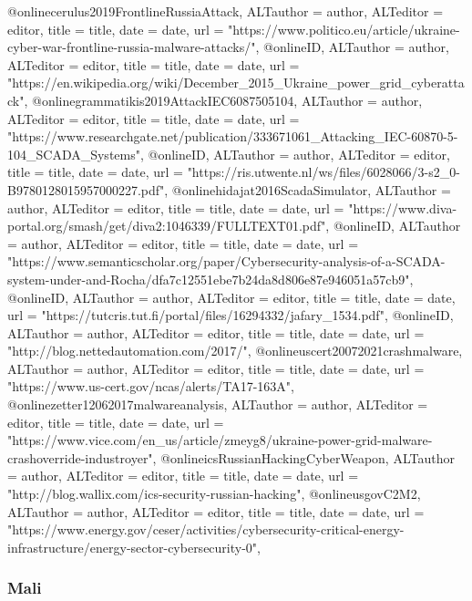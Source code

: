 {{{{{{{{{@online{cerulus2019FrontlineRussiaAttack,	ALTauthor = {author},	ALTeditor = {editor},	title = {title},	date = {date},	url = {"https://www.politico.eu/article/ukraine-cyber-war-frontline-russia-malware-attacks/"},}
@online{ID,	ALTauthor = {author},	ALTeditor = {editor},	title = {title},	date = {date},	url = {"https://en.wikipedia.org/wiki/December_2015_Ukraine_power_grid_cyberattack"},}
@online{grammatikis2019AttackIEC6087505104,	ALTauthor = {author},	ALTeditor = {editor},	title = {title},	date = {date},	url = {"https://www.researchgate.net/publication/333671061_Attacking_IEC-60870-5-104_SCADA_Systems"},}
@online{ID,	ALTauthor = {author},	ALTeditor = {editor},	title = {title},	date = {date},	url = {"https://ris.utwente.nl/ws/files/6028066/3-s2_0-B9780128015957000227.pdf"},}
@online{hidajat2016ScadaSimulator,	ALTauthor = {author},	ALTeditor = {editor},	title = {title},	date = {date},	url = {"https://www.diva-portal.org/smash/get/diva2:1046339/FULLTEXT01.pdf"},}
@online{ID,	ALTauthor = {author},	ALTeditor = {editor},	title = {title},	date = {date},	url = {"https://www.semanticscholar.org/paper/Cybersecurity-analysis-of-a-SCADA-system-under-and-Rocha/dfa7c12551ebe7b24da8d806e87e946051a57cb9"},}
@online{ID,	ALTauthor = {author},	ALTeditor = {editor},	title = {title},	date = {date},	url = {"https://tutcris.tut.fi/portal/files/16294332/jafary_1534.pdf"},}
@online{ID,	ALTauthor = {author},	ALTeditor = {editor},	title = {title},	date = {date},	url = {"http://blog.nettedautomation.com/2017/"},}
@online{uscert20072021crashmalware,	ALTauthor = {author},	ALTeditor = {editor},	title = {title},	date = {date},	url = {"https://www.us-cert.gov/ncas/alerts/TA17-163A"},}
@online{zetter12062017malwareanalysis,	ALTauthor = {author},	ALTeditor = {editor},	title = {title},	date = {date},	url = {"https://www.vice.com/en_us/article/zmeyg8/ukraine-power-grid-malware-crashoverride-industroyer"},}
@online{icsRussianHackingCyberWeapon,	ALTauthor = {author},	ALTeditor = {editor},	title = {title},	date = {date},	url = {"http://blog.wallix.com/ics-security-russian-hacking"},}
@online{usgovC2M2,	ALTauthor = {author},	ALTeditor = {editor},	title = {title},	date = {date},	url = {"https://www.energy.gov/ceser/activities/cybersecurity-critical-energy-infrastructure/energy-sector-cybersecurity-0"},}



\subsubsection{Mali}

}}}}}}}}}
